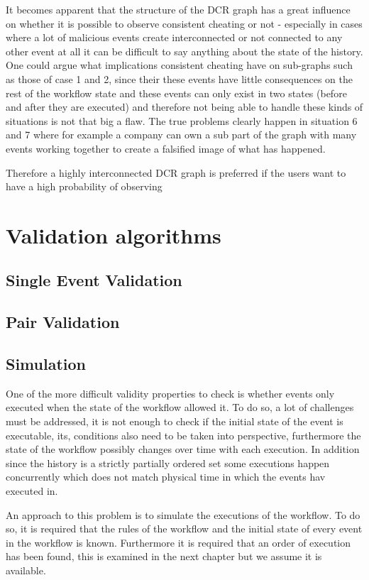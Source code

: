 	\newpar It becomes apparent that the structure of the DCR graph has a great influence on whether it is possible to observe consistent cheating or not - especially in cases where a lot of malicious events create interconnected or not connected to any other event at all it can be difficult to say anything about the state of the history. One could argue what implications consistent cheating have on sub-graphs such as those of case 1 and 2, since their these events have little consequences on the rest of the workflow state and these events can only exist in two states (before and after they are executed) and therefore not being able to handle these kinds of situations is not that big a flaw. The true problems clearly happen in situation 6 and 7 where for example a company can own a sub part of the graph with many events working together to create a falsified image of what has happened. 
	
	\newpar Therefore a highly interconnected DCR graph is preferred if the users want to have a high probability of observing 

	\section{Validation algorithms}
    \subsection{Single Event Validation}
    \subsection{Pair Validation}
    \subsection{Simulation}
    One of the more difficult validity properties to check is whether events only executed when the state of the workflow allowed it. To do so, a lot of challenges must be addressed, it is not enough to check if the initial state of the event is executable, its, conditions also need to be taken into perspective, furthermore the state of the workflow possibly changes over time with each execution. In addition since the history is a strictly partially ordered set some executions happen concurrently which does not match physical time in which the events hav executed in.
    
    \newpar An approach to this problem is to simulate the executions of the workflow. To do so, it is required that the rules of the workflow and the initial state of every event in the workflow is known. Furthermore it is required that an order of execution has been found, this is examined in the next chapter but we assume it is available. 
    
